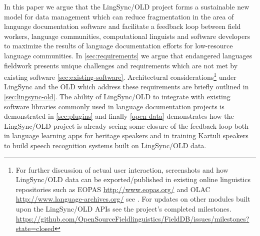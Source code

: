 \documentclass[11pt]{article}
\begin{document}
In this paper we argue that the LingSync/OLD project forms a sustainable new model for data management which can reduce fragmentation in the area of language documentation software 
and facilitate a feedback loop between field workers, language communities, computational linguists and software developers to maximize the results of language documentation efforts for low-resource language communities.
In \autoref{sec:requirements} we argue that
endangered languages fieldwork presents unique challenges and requirements which
are not met by existing software \autoref{sec:existing-software}.  Architectural considerations\footnote{For further discussion of actual user interaction, screenshots and how
LingSync/OLD data can be exported/published in existing online linguistics
repositories such as EOPAS %
\url{http://www.eopas.org/} %
and OLAC %
\url{http://www.language-archives.org/} %
see \cite{lingsync:2012}. For updates on other modules built upon the
LingSync/OLD APIs see the project's completed milestones.%
\url{https://github.com/OpenSourceFieldlinguistics/FieldDB/issues/milestones?state=closed}}
 under LingSync and the OLD which address these requirements are briefly outlined in \autoref{sec:lingsync-old}. 
 The ability of LingSync/OLD to integrate with existing software libraries commonly used in language documentation projects is demonstrated in \autoref{sec:plugins} and finally \autoref{open-data} 
 demonstrates how the LingSync/OLD project is already seeing some closure of the feedback loop both in language learning apps for heritage speakers and in training Kartuli speakers to build speech recognition systems built on LingSync/OLD data. 
 
\end{document}
